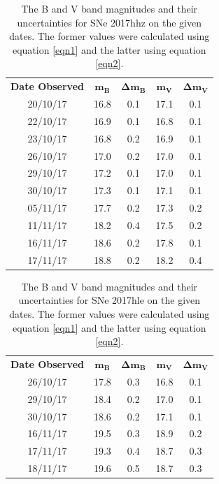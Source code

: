\documentclass[twocolumn]{revtex4}
\begin{document}
\begin{table}[h!]
\centering
\begin{tabular}{c@{\hskip 20pt}c@{\hskip 20pt}c@{\hskip 20pt}c@{\hskip 20pt}c} 
 \hline
 \textbf{Date Observed} & \textbf{$\boldsymbol{m_B}$} & \textbf{$\boldsymbol{\Delta{m_B}}$} & \textbf{$\boldsymbol{m_V}$} & \textbf{$\boldsymbol{\Delta{m_V}}$} \\ [0.5ex] 
 20/10/17 & 16.8 & 0.1 & 17.1 & 0.1 \\
 22/10/17 & 16.9 & 0.1 & 16.8 & 0.1 \\
 23/10/17 & 16.8 & 0.2 & 16.9 & 0.1 \\
 26/10/17 & 17.0 & 0.2 & 17.0 & 0.1 \\
 29/10/17 & 17.2 & 0.1 & 17.0 & 0.1 \\
 30/10/17 & 17.3 & 0.1 & 17.1 & 0.1 \\
 05/11/17 & 17.7 & 0.2 & 17.3 & 0.2 \\
 11/11/17 & 18.2 & 0.4 & 17.5 & 0.2 \\
 16/11/17 & 18.6 & 0.2 & 17.8 & 0.1 \\
 17/11/17 & 18.8 & 0.2 & 18.2 & 0.4 \\
 \hline
\end{tabular}
\caption{The B and V band magnitudes and their uncertainties for SNe 2017hhz on the given dates. The former values were calculated using equation \ref{eqn1} and the latter using equation \ref{eqn2}.}
\label{2017hhz-table}
\end{table}

\begin{table}[h!]
\centering
\begin{tabular}{c@{\hskip 20pt}c@{\hskip 20pt}c@{\hskip 20pt}c@{\hskip 20pt}c} 
 \hline
 \textbf{Date Observed} & \textbf{$\boldsymbol{m_B}$} & \textbf{$\boldsymbol{\Delta{m_B}}$} & \textbf{$\boldsymbol{m_V}$} & \textbf{$\boldsymbol{\Delta{m_V}}$} \\ [0.5ex] 
 26/10/17 & 17.8 & 0.3 & 16.8 & 0.1 \\
 29/10/17 & 18.4 & 0.2 & 17.0 & 0.1 \\
 30/10/17 & 18.6 & 0.2 & 17.1 & 0.1 \\
 16/11/17 & 19.5 & 0.3 & 18.9 & 0.2 \\
 17/11/17 & 19.3 & 0.4 & 18.7 & 0.3 \\
 18/11/17 & 19.6 & 0.5 & 18.7 & 0.3 \\
 \hline
\end{tabular}
\caption{The B and V band magnitudes and their uncertainties for SNe 2017hle on the given dates. The former values were calculated using equation \ref{eqn1} and the latter using equation \ref{eqn2}.}
\label{2017hle-table}
\end{table}
\end{document}
